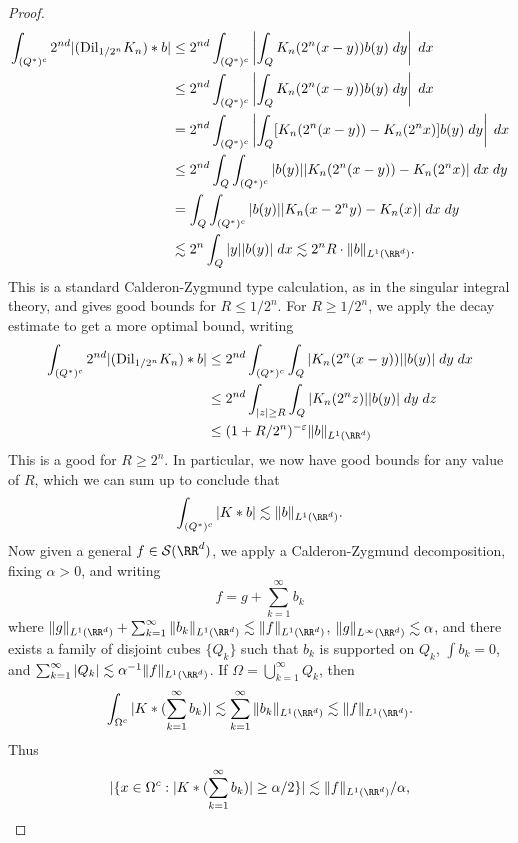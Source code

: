 \begin{proof}
  \begin{align*}
    \int_{(Q^*)^c} 2^{nd} |(\text{Dil}_{1/2^n} K_n) * b| &\leq 2^{nd} \int_{(Q^*)^c} \left| \int_Q K_n(2^n(x - y)) b(y)\; dy \right|\; dx\\
    &\leq 2^{nd} \int_{(Q^*)^c} \left| \int_Q K_n(2^n(x-y)) b(y)\; dy \right|\; dx\\
    &= 2^{nd} \int_{(Q^*)^c} \left| \int_Q [K_n(2^n(x-y)) - K_n(2^n x)] b(y)\; dy \right|\; dx\\
    &\leq 2^{nd} \int_Q \int_{(Q^*)^c} |b(y)| |K_n(2^n(x-y)) - K_n(2^n x)|\; dx\; dy\\
    &= \int_Q \int_{(Q^*)^c} |b(y)| |K_n(x - 2^n y) - K_n(x)|\; dx\; dy\\
    &\lesssim 2^n \int_Q |y| |b(y)|\; dx \lesssim 2^n R \cdot \| b \|_{L^1(\RR^d)}.
  \end{align*}
  This is a standard Calderon-Zygmund type calculation, as in the singular integral theory, and gives good bounds for $R \leq 1/2^n$. For $R \geq 1/2^n$, we apply the decay estimate to get a more optimal bound, writing
  \begin{align*}
    \int_{(Q^*)^c} 2^{nd} |(\text{Dil}_{1/2^n} K_n) * b| &\leq 2^{nd} \int_{(Q^*)^c} \int_Q |K_n(2^n(x - y))| |b(y)|\; dy\; dx\\
        &\leq 2^{nd} \int_{|z| \geq R} \int_Q |K_n(2^n z)| |b(y)|\; dy\; dz\\
        &\leq (1 + R/2^n)^{-\varepsilon} \| b \|_{L^1(\RR^d)}
  \end{align*}
  This is a good for $R \geq 2^n$. In particular, we now have good bounds for any value of $R$, which we can sum up to conclude that
  \[ \int_{(Q^*)^c} |K * b| \lesssim \| b \|_{L^1(\RR^d)}. \]
  Now given a general $f \in \mathcal{S}(\RR^d)$, we apply a Calderon-Zygmund decomposition, fixing $\alpha > 0$, and writing
  \[ f = g + \sum_{k = 1}^\infty b_k \]
  where $\| g \|_{L^1(\RR^d)} + \sum_{k = 1}^\infty \| b_k \|_{L^1(\RR^d)} \lesssim \| f \|_{L^1(\RR^d)}$, $\| g \|_{L^\infty(\RR^d)} \lesssim \alpha$, and there exists a family of disjoint cubes $\{ Q_k \}$ such that $b_k$ is supported on $Q_k$, $\int b_k = 0$, and $\sum_{k = 1}^\infty |Q_k| \lesssim \alpha^{-1} \| f \|_{L^1(\RR^d)}$. If $\Omega = \bigcup_{k = 1}^\infty Q_k$, then
  \[ \int_{\Omega^c} |K * (\sum_{k = 1}^\infty b_k)| \lesssim \sum_{k = 1}^\infty \| b_k \|_{L^1(\RR^d)} \lesssim \| f \|_{L^1(\RR^d)}. \]
  Thus
  \[ |\{ x \in \Omega^c : |K * (\sum_{k = 1}^\infty b_k)| \geq \alpha/2 \}| \lesssim \| f \|_{L^1(\RR^d)} / \alpha, \]

\end{proof}
